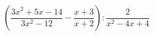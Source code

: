 \begin{ex}[type=expression]
	\begin{condition}
		\( \left( \dfrac{3x^2+5x-14}{3x^2-12}-\dfrac{x+3}{x+2} \right) :\dfrac{2}{x^2-4x+4}\)
	\end{condition}
\end{ex}